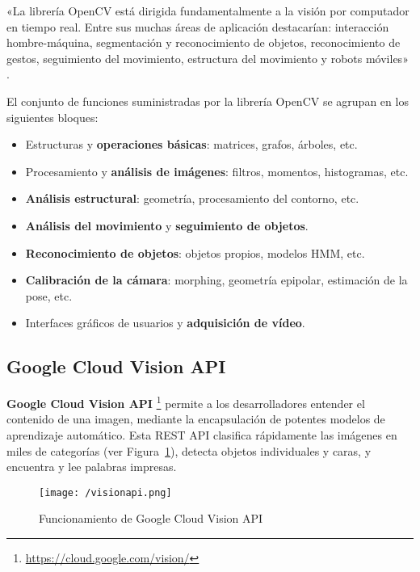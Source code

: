 «La librería OpenCV está dirigida fundamentalmente a la visión por computador en tiempo real. Entre sus muchas áreas de aplicación destacarían: interacción hombre-máquina, segmentación y reconocimiento de objetos, reconocimiento de gestos, seguimiento del movimiento, estructura del movimiento y robots móviles» \cite{opencv}.

El conjunto de funciones suministradas por la librería OpenCV se agrupan en los siguientes bloques: 
\begin{itemize}
\item Estructuras y \textbf{operaciones básicas}: matrices, grafos, árboles, etc.
\item Procesamiento y \textbf{análisis de imágenes}: filtros, momentos, histogramas, etc.
\item \textbf{Análisis estructural}: geometría, procesamiento del contorno, etc.
\item \textbf{Análisis del movimiento} y \textbf{seguimiento de objetos}.
\item \textbf{Reconocimiento de objetos}: objetos propios, modelos \acs{HMM}, etc.
\item \textbf{Calibración de la cámara}: morphing, geometría epipolar, estimación de la pose, etc.
\item Interfaces gráficos de usuarios y \textbf{adquisición de vídeo}.
\end{itemize}

\subsection{Google Cloud Vision API}
\label{sec:visionapi}

\textbf{Google Cloud Vision API} \footnote{\url{https://cloud.google.com/vision/}} permite a los desarrolladores entender el contenido de una imagen, mediante la encapsulación de potentes modelos de aprendizaje automático. Esta REST API clasifica rápidamente las imágenes en miles de categorías (ver Figura~\ref{fig:visionapi}), detecta objetos individuales y caras, y encuentra y lee palabras impresas.

\begin{figure}[!h]
\begin{center}
\texttt{[image: /visionapi.png]}
\caption[Funcionamiento de Google Cloud Vision API]{Funcionamiento de Google Cloud Vision API}
\label{fig:visionapi}
\end{center}
\end{figure}

